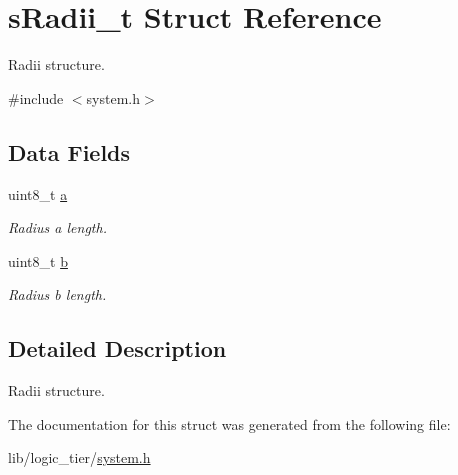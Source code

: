 \hypertarget{structs_radii__t}{}\section{s\+Radii\+\_\+t Struct Reference}
\label{structs_radii__t}


Radii structure.  




{\ttfamily \#include $<$system.\+h$>$}

\subsection*{Data Fields}
\begin{DoxyCompactItemize}
\item 
uint8\+\_\+t \hyperlink{structs_radii__t_af4007aacd75b22aee32dba9ea96082c0}{a}\hypertarget{structs_radii__t_af4007aacd75b22aee32dba9ea96082c0}{}\label{structs_radii__t_af4007aacd75b22aee32dba9ea96082c0}

\begin{DoxyCompactList}\small\item\em Radius a length. \end{DoxyCompactList}\item 
uint8\+\_\+t \hyperlink{structs_radii__t_a4313c9563516f94387762ab05763456b}{b}\hypertarget{structs_radii__t_a4313c9563516f94387762ab05763456b}{}\label{structs_radii__t_a4313c9563516f94387762ab05763456b}

\begin{DoxyCompactList}\small\item\em Radius b length. \end{DoxyCompactList}\end{DoxyCompactItemize}


\subsection{Detailed Description}
Radii structure. 

The documentation for this struct was generated from the following file\+:\begin{DoxyCompactItemize}
\item 
lib/logic\+\_\+tier/\hyperlink{system_8h}{system.\+h}\end{DoxyCompactItemize}

